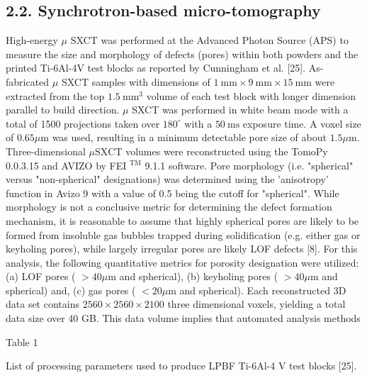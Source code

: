 \documentclass[10pt]{article}
\begin{document}
\subsection*{2.2. Synchrotron-based micro-tomography}
High-energy $\mu$ SXCT was performed at the Advanced Photon Source (APS) to measure the size and morphology of defects (pores) within both powders and the printed Ti-6Al-4V test blocks as reported by Cunningham et al. [25]. As-fabricated $\mu$ SXCT samples with dimensions of $1 \mathrm{~mm} \times 9 \mathrm{~mm} \times 15 \mathrm{~mm}$ were extracted from the top $1.5 \mathrm{~mm}^{3}$ volume of each test block with longer dimension parallel to build direction. $\mu$ SXCT was performed in white beam mode with a total of 1500 projections taken over $180^{\circ}$ with a $50 \mathrm{~ms}$ exposure time. A voxel size of $0.65 \mu \mathrm{m}$ was used, resulting in a minimum detectable pore size of about $1.5 \mu \mathrm{m}$. Three-dimensional $\mu \mathrm{SXCT}$ volumes were reconstructed using the TomoPy 0.0.3.15 and AVIZO by FEI $^{\mathrm{TM}}$ 9.1.1 software. Pore morphology (i.e. "spherical" versus "non-spherical" designations) was determined using the 'anisotropy' function in Avizo 9 with a value of 0.5 being the cutoff for "spherical". While morphology is not a conclusive metric for determining the defect formation mechanism, it is reasonable to assume that highly spherical pores are likely to be formed from insoluble gas bubbles trapped during solidification (e.g. either gas or keyholing pores), while largely irregular pores are likely LOF defects [8]. For this analysis, the following quantitative metrics for porosity designation were utilized: (a) LOF pores ( $>40 \mu \mathrm{m}$ and spherical), (b) keyholing pores ( $>40 \mu \mathrm{m}$ and spherical) and, (c) gas pores ( $<20 \mu \mathrm{m}$ and spherical). Each reconstructed 3D data set contains $2560 \times 2560 \times 2100$ three dimensional voxels, yielding a total data size over 40 GB. This data volume implies that automated analysis methods

Table 1

List of processing parameters used to produce LPBF Ti-6Al-4 V test blocks [25].
\end{document}
